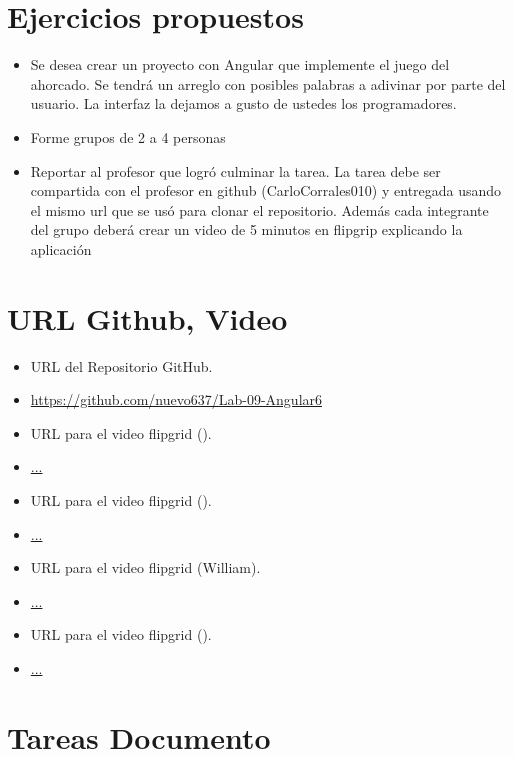 \documentclass{article}
\begin{document}
	\clearpage




	\section{Ejercicios propuestos}
	\begin{itemize}		
		\item Se desea crear un proyecto con Angular que implemente el juego del ahorcado.  Se tendrá un arreglo con posibles palabras a adivinar por parte del usuario.  La interfaz la dejamos a gusto de ustedes los programadores.
		\item Forme grupos de 2 a 4 personas
		\item Reportar al profesor que logró culminar la tarea. La tarea debe ser compartida con el profesor en github (CarloCorrales010) y entregada usando el mismo url que se usó para clonar el repositorio.   Además cada integrante del grupo deberá crear un video de 5 minutos en flipgrip explicando la aplicación
		
	\end{itemize}
	\section{URL Github, Video}
	\begin{itemize}
		\item URL del Repositorio GitHub.
		\item \url{https://github.com/nuevo637/Lab-09-Angular6}
		\item URL para el video flipgrid ().
		\item \url{...}	
		\item URL para el video flipgrid ().
		\item \url{...}	
		\item URL para el video flipgrid (William).
		\item \url{...}	
		\item URL para el video flipgrid ().
		\item \url{...}	
		
	\end{itemize}
	\clearpage
	
	\section{Tareas Documento}
\end{document}
